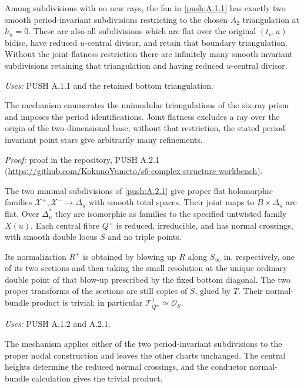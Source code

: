 \begin{announcement}[PUSH A.2.1; A]\label{push:A.2.1}
Among subdivisions with no new rays, the fan in \ref{push:A.1.1} has exactly
two smooth period-invariant subdivisions restricting to the chosen
$A_2$ triangulation at $h_u=0$. These are also all subdivisions
which are flat over the original $(t_c,u)$ bidisc, have reduced
$u$-central divisor, and retain that boundary triangulation.
Without the joint-flatness restriction there are infinitely many
smooth invariant subdivisions retaining that triangulation and
having reduced $u$-central divisor.
\end{announcement}
\noindent\emph{Uses:} PUSH A.1.1 and the retained bottom triangulation.\par

The mechanism enumerates the unimodular triangulations of the six-ray prism and imposes the period identifications. Joint flatness excludes a ray over the origin of the two-dimensional base; without that restriction, the stated period-invariant point stars give arbitrarily many refinements.

\noindent\emph{Proof:} proof in the repository, PUSH A.2.1 (\url{https://github.com/KokunoYumeto/s6-complex-structure-workbench}).

\begin{announcement}[PUSH A.2.2; A]\label{push:A.2.2}
The two minimal subdivisions of \ref{push:A.2.1} give proper flat holomorphic
families $\mathcal X^+,\mathcal X^-\to\Delta_u$ with smooth total
spaces. Their joint maps to $B\times\Delta_u$ are flat. Over
$\Delta_u^*$ they are isomorphic as families to the specified
untwisted family $X(u)$. Each central fibre $Q^\pm$ is reduced,
irreducible, and has normal crossings, with smooth double locus
$S$ and no triple points.

Its normalization $R^\pm$ is obtained by blowing up $R$ along
$S_\infty$ in, respectively, one of its two sections and then
taking the small resolution at the unique ordinary double point
of that blow-up prescribed by the fixed bottom diagonal.
The two proper transforms of the sections are still copies of
$S$, glued by $T$. Their normal-bundle product is trivial;
in particular $\mathcal T^1_{Q^\pm}\simeq\mathcal O_S$.
\end{announcement}
\noindent\emph{Uses:} PUSH A.1.2 and A.2.1.\par

The mechanism applies either of the two period-invariant subdivisions to the proper nodal construction and leaves the other charts unchanged. The central heights determine the reduced normal crossings, and the conductor normal-bundle calculation gives the trivial product.

